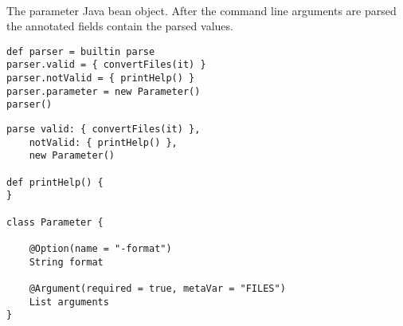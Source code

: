 \begin{asparadesc}
%
\item[\code{theParameter}] \hfill \\
The parameter Java bean object. After the command line arguments are parsed
the annotated fields contain the parsed values.
%
\end{asparadesc}

\begin{lstlisting}[style=Groovybash, label={lst:example_arguments_parse}, title={\Command{parse} command: storing the parse command in a variable and set the arguments and parse the command line arguments at a later point.}]
def parser = builtin parse
parser.valid = { convertFiles(it) }
parser.notValid = { printHelp() }
parser.parameter = new Parameter()
parser()
\end{lstlisting}

\begin{lstlisting}[style=Groovybash, label={lst:example_arguments_parse}, title={\Command{parse} command: parse command line arguments; valid and not-valid closures are called depending on whether the arguments are valid.}]
parse valid: { convertFiles(it) },
    notValid: { printHelp() },
    new Parameter()
    
def printHelp() {
}

class Parameter {

    @Option(name = "-format")
    String format

    @Argument(required = true, metaVar = "FILES")
    List arguments
}

\end{lstlisting}

